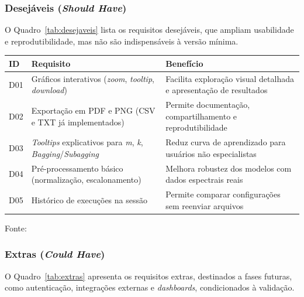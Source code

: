 \subsubsection{Desejáveis (\textit{Should Have})}
\label{ssubsec:desejaveis}

O Quadro~\ref{tab:desejaveis} lista os requisitos desejáveis, que ampliam usabilidade e reprodutibilidade, mas não são indispensáveis à versão mínima.

\begin{quadro}[ht]
\begin{center}
\small
\captionsetup{justification=centering, labelsep=endash, width=0.75\linewidth}
\caption{Requisitos desejáveis do sistema.}
\label{tab:desejaveis}
\begin{threeparttable}
\begin{tabularx}{\textwidth}{|l|X|X|} \hline
\textbf{ID} & \textbf{Requisito} & \textbf{Benefício} \\ \hline
D01 & Gráficos interativos (\textit{zoom}, \textit{tooltip}, \textit{download}) & Facilita exploração visual detalhada e apresentação de resultados \\ \hline
D02 & Exportação em PDF e PNG (CSV e TXT já implementados) & Permite documentação, compartilhamento e reprodutibilidade \\ \hline
D03 & \textit{Tooltips} explicativos para \textit{m}, \textit{k}, \textit{Bagging}/\textit{Subagging} & Reduz curva de aprendizado para usuários não especialistas \\ \hline
D04 & Pré-processamento básico (normalização, escalonamento) & Melhora robustez dos modelos com dados espectrais reais \\ \hline
D05 & Histórico de execuções na sessão & Permite comparar configurações sem reenviar arquivos \\ \hline
\end{tabularx}
\begin{tablenotes}[flushleft]
\footnotesize
\item Fonte:~\oautor
\end{tablenotes}
\end{threeparttable}
\end{center}
\end{quadro}


\newpage
\subsubsection{Extras (\textit{Could Have})}
\label{ssubsec:extras}
O Quadro~\ref{tab:extras} apresenta os requisitos extras, destinados a fases futuras, como autenticação, integrações externas e \textit{dashboards}, condicionados à validação.

